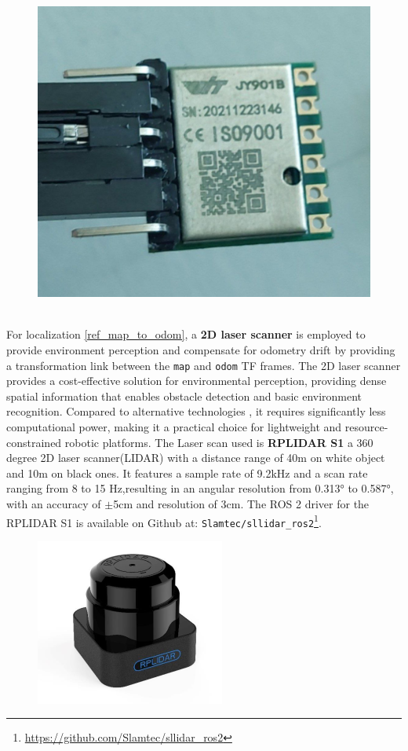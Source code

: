 \begin{figure}[h]
	\centering
	\includegraphics[width=0.4\linewidth]{img/IMU.jpg}
\end{figure}\\
For localization \ref{ref_map_to_odom}, a \textbf{2D laser scanner} is employed to provide environment perception and compensate for odometry drift by providing a transformation link between the \texttt{map} and \texttt{odom} TF frames.
The 2D laser scanner provides a cost-effective solution for environmental perception, providing dense spatial information that enables obstacle detection and basic environment recognition. Compared to alternative technologies \cite{10056144}\cite{vslamComparison2021}, it requires significantly less computational power, making it a practical choice for lightweight and resource-constrained robotic platforms.
The Laser scan used is \textbf{RPLIDAR S1} a 360 degree 2D laser scanner(LIDAR) with a distance range of 40m on white object and 10m on black ones. It features a sample rate of 9.2kHz and a scan rate ranging from 8 to 15 Hz,resulting in an angular resolution from 0.313° to 0.587°, with an accuracy of $\pm$5cm and resolution of 3cm.
The ROS 2 driver for the RPLIDAR S1 is available on Github at: \texttt{Slamtec/sllidar\_ros2}\footnote{\href{https://github.com/Slamtec/sllidar_ros2}{https://github.com/Slamtec/sllidar\_ros2}}.
\begin{figure}[h]
	\centering
	\includegraphics[width=0.4\linewidth]{img/laserScanRPLIDAR.png}
\end{figure}
